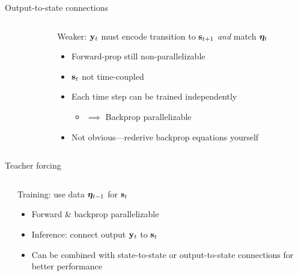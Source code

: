 \begin{frame}{Output-to-state connections}
    \begin{columns}
        \begin{column}{0.47\textwidth}
            
        \end{column}

        \begin{column}{0.53\textwidth}
            \begin{block}{}
                Weaker: $\mathbf{y}_t$ must encode transition to $\mathbf{s}_{t+1}$ \emph{and} match $\bm{\eta}_t$
            \end{block}

            \begin{itemize}
                \item Forward-prop still non-parallelizable
                \item $\mathbf{s}_t$ not time-coupled
                \item Each time step can be trained independently
                \begin{itemize}
                    \item $\implies$ Backprop parallelizable
                \end{itemize}
                \item Not obvious---rederive backprop equations yourself \smiley
            \end{itemize}
        \end{column}
    \end{columns}
\end{frame}

\begin{frame}{Teacher forcing}
    \begin{columns}
        \begin{column}{0.47\textwidth}
            
        \end{column}

        \begin{column}{0.53\textwidth}
            \begin{block}{}
                Training: use data $\bm{\eta}_{t-1}$ for $\mathbf{s}_t$
            \end{block}

            \begin{itemize}[<.->]
                \item Forward \& backprop parallelizable
                \item<+-> Inference: connect output $\mathbf{y}_t$ to $\mathbf{s}_t$
                \item Can be combined with state-to-state or output-to-state connections for better performance
            \end{itemize}
        \end{column}
    \end{columns}
\end{frame}

